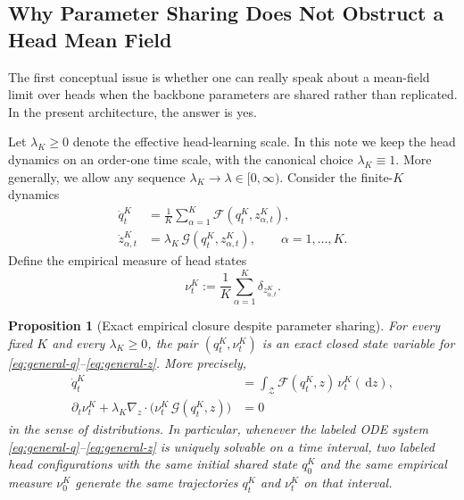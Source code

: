 \documentclass{article}
\newtheorem{proposition}[theorem]{Proposition}
\theoremstyle{definition}
\newcommand{\dd}{\,\mathrm{d}}
\begin{document}
\subsection{Why Parameter Sharing Does Not Obstruct a Head Mean Field}

The first conceptual issue is whether one can really speak about a mean-field limit over heads when the backbone parameters are shared rather than replicated. In the present architecture, the answer is yes.

Let $\lambda_K\ge 0$ denote the effective head-learning scale. In this note we keep the head dynamics on an order-one time scale, with the canonical choice $\lambda_K\equiv 1$. More generally, we allow any sequence $\lambda_K\to\lambda\in[0,\infty)$. Consider the finite-$K$ dynamics
\begin{align}
  \dot q_t^K
  &=
  \frac1K\sum_{\alpha=1}^K \mathcal F(q_t^K,z_{\alpha,t}^K),
  \label{eq:general-q}
  \\
  \dot z_{\alpha,t}^K
  &=
  \lambda_K\,\mathcal G(q_t^K,z_{\alpha,t}^K),
  \qquad
  \alpha=1,\dots,K.
  \label{eq:general-z}
\end{align}
Define the empirical measure of head states
\[
  \nu_t^K := \frac1K\sum_{\alpha=1}^K \delta_{z_{\alpha,t}^K}.
\]

\begin{proposition}[Exact empirical closure despite parameter sharing]
\label{prop:closure}
For every fixed $K$ and every $\lambda_K\ge 0$, the pair $(q_t^K,\nu_t^K)$ is an exact closed state variable for \eqref{eq:general-q}--\eqref{eq:general-z}. More precisely,
\begin{align}
  \dot q_t^K
  &=
  \int_{\mathcal Z}\mathcal F(q_t^K,z)\,\nu_t^K(\dd z),
  \label{eq:closure-q}
  \\
  \partial_t \nu_t^K
  +
  \lambda_K\nabla_z\cdot\bigl(\nu_t^K\,\mathcal G(q_t^K,z)\bigr)
  &=
  0
  \label{eq:closure-nu}
\end{align}
in the sense of distributions. In particular, whenever the labeled ODE system \eqref{eq:general-q}--\eqref{eq:general-z} is uniquely solvable on a time interval, two labeled head configurations with the same initial shared state $q_0^K$ and the same empirical measure $\nu_0^K$ generate the same trajectories $q_t^K$ and $\nu_t^K$ on that interval.
\end{proposition}
\end{document}
